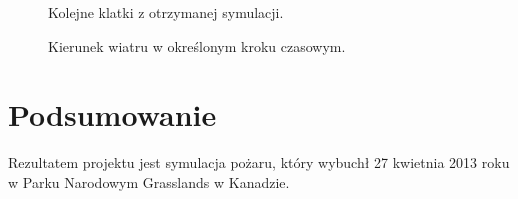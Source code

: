 \documentclass[a4paper,12pt]{article}
\begin{document}
\begin{figure}[H]
    \qquad
    \caption{Kolejne klatki z otrzymanej symulacji.}%
\end{figure}

\begin{figure}[H]
    \centering
    \qquad
    \qquad
    \caption{Kierunek wiatru w określonym kroku czasowym.}%
\end{figure}


\section{Podsumowanie}
Rezultatem projektu jest symulacja pożaru, który wybuchł 27 kwietnia 2013 roku w Parku Narodowym Grasslands w Kanadzie.
\end{document}
